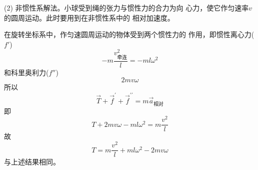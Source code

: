 (2) 非惯性系解法。小球受到绳的张力与惯性力的合力为向
心力，使它作匀速率$ v $的圆周运动。此时要用到在非惯性系中的
相对加速度。

在旋转坐标系中，作匀速圆周运动的物体受到两个惯性力的
作用，即惯性离心力($ f' $)
\begin{equation*}
    - m \frac { v _\text{牵连} ^ { 2 } } { l } = - m l \omega ^ { 2 }
\end{equation*}
和科里奥利力($ f'' $)
\begin{equation*}
    2 m v \omega
\end{equation*}
所以\vspace{-1.8em}
\begin{equation*}
    \vec{T} + \vec{f} ^ { \prime } + \vec{f} ^ { \prime \prime } = m \vec{a} _ \text{相对}
\end{equation*}
即\vspace{-1.8em}
\begin{equation*}
    T + 2 m v \omega - m l \omega ^ { 2 } = m \frac { v ^ { 2 } } { l }
\end{equation*}
故\vspace{-1.8em}
\begin{equation*}
    T = m \frac { v ^ { 2 } } { l } + m l \omega ^ { 2 } - 2 m v \omega
\end{equation*}
与上述结果相同。